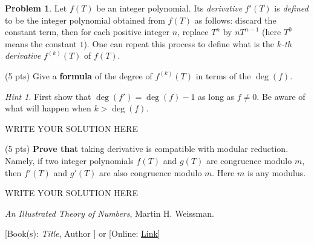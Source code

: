 \documentclass[11pt]{article}
\theoremstyle{plain}
\theoremstyle{definition}
\newtheorem{problem}{Problem}
\theoremstyle{remark}
\newtheorem*{hint}{Hint}
\numberwithin{equation}{problem}
\begin{document}
\begin{problem}
	Let $f(T)$ be an integer polynomial. Its \emph{derivative} $f'(T)$ is \emph{defined} to be the integer polynomial obtained from $f(T)$ as follows: discard the constant term, then for each positive integer $n$, replace $T^n$ by $nT^{n-1}$ (here $T^0$ means the constant $1$). 
	One can repeat this process to define what is the \emph{$k$-th derivative} $f^{(k)}(T)$ of $f(T)$.
	\begin{listinprob}
		\item (5 pts) Give a \textbf{formula} of the degree of $f^{(k)}(T)$ in terms of the $\deg(f)$. 
		\begin{hint}
			First show that $\deg(f')=\deg(f)-1$ as long as $f\neq 0$. Be aware of what will happen when $k>\deg(f)$.
		\end{hint}
\begin{solution} %
WRITE YOUR SOLUTION HERE
\end{solution}\clearpage %

		\item (5 pts) \textbf{Prove that} taking derivative is compatible with modular reduction. Namely, if two integer polynomials $f(T)$ and $g(T)$ are congruence modulo $m$, then $f'(T)$ and $g'(T)$ are also congruence modulo $m$. Here $m$ is any modulus.
	\end{listinprob}	
\end{problem}
\begin{solution} %
WRITE YOUR SOLUTION HERE
\end{solution}\clearpage %

\begin{thebibliography}{9}  %
\emph{An Illustrated Theory of Numbers}, Martin H. Weissman.

[Book(s): \emph{Title}, Author ] or [Online: \href{http://example.com/}{Link}]
\end{thebibliography}  %
\end{document}

